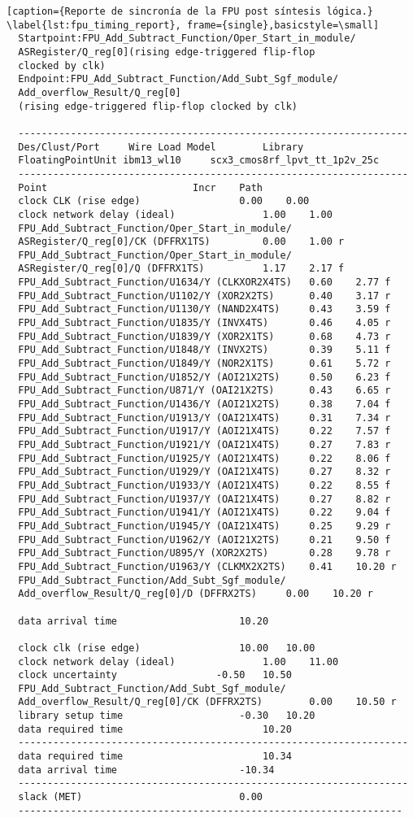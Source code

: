 \begin{lstlisting}[caption={Reporte de sincronía de la FPU post síntesis lógica.} \label{lst:fpu_timing_report}, frame={single},basicstyle=\small]
  Startpoint:FPU_Add_Subtract_Function/Oper_Start_in_module/
  ASRegister/Q_reg[0](rising edge-triggered flip-flop 
  clocked by clk)
  Endpoint:FPU_Add_Subtract_Function/Add_Subt_Sgf_module/
  Add_overflow_Result/Q_reg[0]
  (rising edge-triggered flip-flop clocked by clk)
    
  -------------------------------------------------------------------
  Des/Clust/Port     Wire Load Model       	Library
  FloatingPointUnit	ibm13_wl10     scx3_cmos8rf_lpvt_tt_1p2v_25c
  -------------------------------------------------------------------
  Point							Incr	Path
  clock CLK (rise edge)					0.00	0.00
  clock network delay (ideal)				1.00	1.00
  FPU_Add_Subtract_Function/Oper_Start_in_module/
  ASRegister/Q_reg[0]/CK (DFFRX1TS)			0.00	1.00 r
  FPU_Add_Subtract_Function/Oper_Start_in_module/
  ASRegister/Q_reg[0]/Q (DFFRX1TS)			1.17	2.17 f
  FPU_Add_Subtract_Function/U1634/Y (CLKXOR2X4TS)	0.60	2.77 f
  FPU_Add_Subtract_Function/U1102/Y (XOR2X2TS)		0.40	3.17 r
  FPU_Add_Subtract_Function/U1130/Y (NAND2X4TS)		0.43    3.59 f
  FPU_Add_Subtract_Function/U1835/Y (INVX4TS)		0.46	4.05 r
  FPU_Add_Subtract_Function/U1839/Y (XOR2X1TS)		0.68	4.73 r
  FPU_Add_Subtract_Function/U1848/Y (INVX2TS)		0.39	5.11 f
  FPU_Add_Subtract_Function/U1849/Y (NOR2X1TS)		0.61	5.72 r
  FPU_Add_Subtract_Function/U1852/Y (AOI21X2TS)		0.50	6.23 f
  FPU_Add_Subtract_Function/U871/Y (OAI21X2TS)		0.43	6.65 r
  FPU_Add_Subtract_Function/U1436/Y (AOI21X2TS)		0.38	7.04 f
  FPU_Add_Subtract_Function/U1913/Y (OAI21X4TS)		0.31	7.34 r
  FPU_Add_Subtract_Function/U1917/Y (AOI21X4TS)		0.22	7.57 f
  FPU_Add_Subtract_Function/U1921/Y (OAI21X4TS)		0.27	7.83 r
  FPU_Add_Subtract_Function/U1925/Y (AOI21X4TS)		0.22	8.06 f
  FPU_Add_Subtract_Function/U1929/Y (OAI21X4TS)		0.27	8.32 r
  FPU_Add_Subtract_Function/U1933/Y (AOI21X4TS)		0.22	8.55 f
  FPU_Add_Subtract_Function/U1937/Y (OAI21X4TS)		0.27	8.82 r
  FPU_Add_Subtract_Function/U1941/Y (AOI21X4TS)		0.22	9.04 f
  FPU_Add_Subtract_Function/U1945/Y (OAI21X4TS)		0.25	9.29 r
  FPU_Add_Subtract_Function/U1962/Y (AOI21X2TS)		0.21	9.50 f
  FPU_Add_Subtract_Function/U895/Y (XOR2X2TS)		0.28	9.78 r
  FPU_Add_Subtract_Function/U1963/Y (CLKMX2X2TS)	0.41	10.20 r
  FPU_Add_Subtract_Function/Add_Subt_Sgf_module/
  Add_overflow_Result/Q_reg[0]/D (DFFRX2TS)		0.00	10.20 r
  
  data arrival time						10.20

  clock clk (rise edge)					10.00	10.00
  clock network delay (ideal)				1.00	11.00
  clock uncertainty					-0.50	10.50
  FPU_Add_Subtract_Function/Add_Subt_Sgf_module/
  Add_overflow_Result/Q_reg[0]/CK (DFFRX2TS)		0.00	10.50 r
  library setup time					-0.30	10.20
  data required time						10.20
  -------------------------------------------------------------------
  data required time						10.34
  data arrival time						-10.34
  -------------------------------------------------------------------
  slack (MET)							0.00
  ------------------------------------------------------------------
\end{lstlisting}

